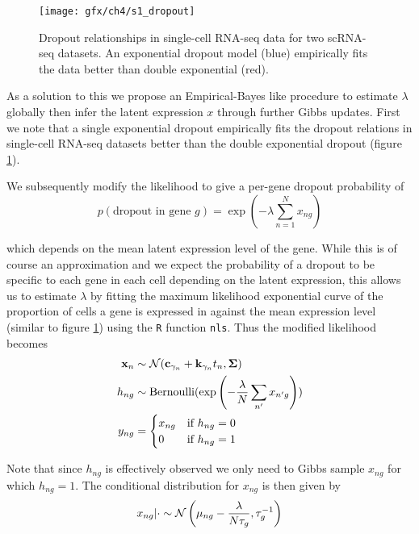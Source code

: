 \begin{figure}%
	\centering
	\texttt{[image: gfx/ch4/s1\_dropout]}
	\caption[Dropout relationships in single-cell RNA-seq data for two scRNA-seq datasets. ]{Dropout relationships in single-cell RNA-seq data for two scRNA-seq datasets. An exponential dropout model (blue) empirically fits the data better than double exponential (red).} \label{fig:dropout}
\end{figure}

As a solution to this we propose an Empirical-Bayes like procedure to estimate $\lambda$ globally then infer the latent expression $x$ through further Gibbs updates. First we note that a single exponential dropout empirically fits the dropout relations in single-cell RNA-seq datasets better than the double exponential dropout (figure \ref{fig:dropout}).

We subsequently modify the likelihood to give a per-gene dropout probability of
\begin{equation}
p(\text{dropout in gene $g$}) = \exp(-\lambda \sum_{n=1}^N x_{ng})
\end{equation}

 which depends on the mean latent expression level of the gene. While this is of course an approximation and we expect the probability of a dropout to be specific to each gene in each cell depending on the latent expression, this allows us to estimate $\lambda$ by fitting the maximum likelihood exponential curve of the proportion of cells a gene is expressed in against the mean expression level (similar to figure \ref{fig:dropout}) using the \texttt{R} function \texttt{nls}. Thus the modified likelihood becomes
\begin{equation}
\begin{aligned}
{\bf x}_n & \sim \mathcal{N}({\bf c}_{\gamma_n} + {\bf k}_{\gamma_n} t_n,\bm{\Sigma}) \\
h_{ng} & \sim \mathrm{Bernoulli}(\exp\left(-\frac{\lambda}{N} \sum_{n'} x_{n'g} \right)) \\
y_{ng} & = \begin{cases} x_{ng} &\mbox{if $h_{ng} = 0$}  \\
0 & \mbox{if $h_{ng} = 1$} \end{cases}
\end{aligned}
\end{equation}

Note that since $h_{ng}$ is effectively observed we only need to Gibbs sample $x_{ng}$ for which $h_{ng} = 1$. The conditional distribution for $x_{ng}$ is then given by
\begin{equation}
x_{ng} | \cdot \sim \mathcal{N}\left( \mu_{ng} - \frac{\lambda}{N \tau_g}, \tau_g^{-1} \right)
\end{equation}

